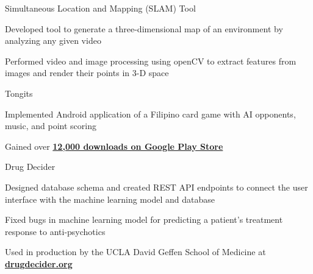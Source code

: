 \documentclass[12pt, letterpaper]{awesome-cv}
\begin{document}
\begin{cventries}
\end{cventries}

\begin{cventries}
  \cventry
    {} %
    {Simultaneous Location and Mapping (SLAM) Tool} %
    {} %
    {} %
    {
      \vspace{-0.2in}
      \begin{cvitems} %
        \item {Developed tool to generate a three-dimensional map of an environment by analyzing any given video}
		    \item {Performed video and image processing using openCV to extract features from images and render their points in 3-D space}
      \end{cvitems}
    }

  \cventry
    {} %
    {Tongits} %
    {} %
    {} %
    {
      \vspace{-0.2in}
      \begin{cvitems} %
      	\item {Implemented Android application of a Filipino card game with AI opponents, music, and point scoring}
		    \item 
            Gained over \href{https://play.google.com/store/apps/details?id=com.creativelabs.tongits&hl=en_US/}{\textbf{12,000 downloads on Google Play Store}}
      \end{cvitems}
    }

  \cventry
    {} %
    {Drug Decider} %
    {} %
    {} %
    {
      \vspace{-0.2in}
      \begin{cvitems} %
      	\item {Designed database schema and created REST API endpoints to connect the user interface with the machine learning model and database}
		    \item {Fixed bugs in machine learning model for predicting a patient’s treatment response to anti-psychotics}
        \item
            Used in production by the UCLA David Gef\/fen School of Medicine at \href{https://drugdecider.org}{\textbf{drugdecider.org}}
      \end{cvitems}
    }

\end{cventries}
\end{document}
